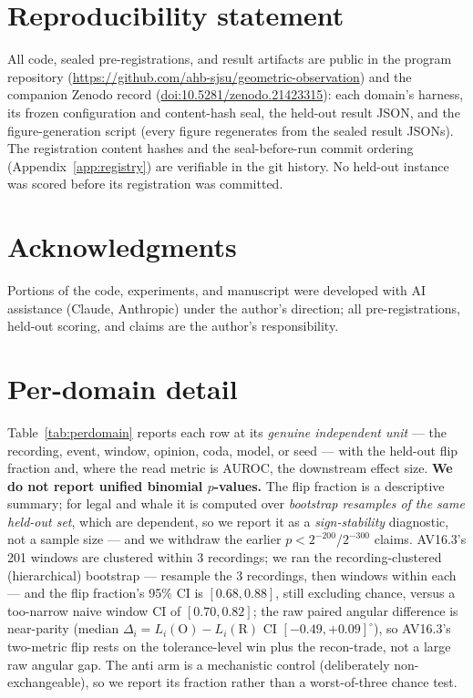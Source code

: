 \documentclass[11pt]{article}
\theoremstyle{remark}
\begin{document}
\section*{Reproducibility statement}
\sloppy
All code, sealed pre-registrations, and result artifacts are public in the program
repository (\url{https://github.com/ahb-sjsu/geometric-observation}) and the companion
Zenodo record (\href{https://doi.org/10.5281/zenodo.21423315}{doi:10.5281/zenodo.21423315}):
each domain's harness, its frozen configuration and content-hash seal, the held-out result
JSON, and the figure-generation script (every figure regenerates from the sealed result
JSONs). The registration content hashes and the seal-before-run commit ordering
(Appendix~\ref{app:registry}) are verifiable in the git history. No held-out instance was
scored before its registration was committed.

\section*{Acknowledgments}
Portions of the code, experiments, and manuscript were developed with AI assistance
(Claude, Anthropic) under the author's direction; all pre-registrations, held-out scoring,
and claims are the author's responsibility.




\appendix

\section{Per-domain detail}\label{app:domains}

Table~\ref{tab:perdomain} reports each row at its \emph{genuine independent unit} --- the
recording, event, window, opinion, coda, model, or seed --- with the held-out flip fraction
and, where the read metric is AUROC, the downstream effect size. \textbf{We do not report
unified binomial $p$-values.} The flip fraction is a descriptive summary; for legal and whale
it is computed over \emph{bootstrap resamples of the same held-out set}, which are dependent,
so we report it as a \emph{sign-stability} diagnostic, not a sample size --- and we withdraw
the earlier $p<2^{-200}$/$2^{-300}$ claims. AV16.3's 201 windows are clustered within 3
recordings; we ran the recording-clustered (hierarchical) bootstrap --- resample the 3
recordings, then windows within each --- and the flip fraction's 95\% CI is $[0.68,0.88]$,
still excluding chance, versus a too-narrow naive window CI of $[0.70,0.82]$; the raw paired
angular difference is near-parity (median $\Delta_i=L_i(\mathrm O)-L_i(\mathrm R)$ CI
$[-0.49,+0.09]^\circ$), so AV16.3's two-metric flip rests on the tolerance-level win plus the
recon-trade, not a large raw angular gap. The anti arm is a mechanistic control (deliberately
non-exchangeable), so we report its fraction rather than a worst-of-three chance test.
\end{document}
